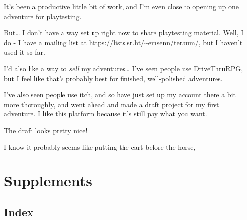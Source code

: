 \documentclass[11pt]{article}
\begin{document}
It's been a productive little bit of work, and I'm even close to
opening up one adventure for playtesting.

But\ldots{} I don't have a way set up right now to share playtesting
material. Well, I do - I have a mailing list at
\url{https://lists.sr.ht/\~emsenn/teraum/}, but I haven't used it so far.

I'd also like a way to \emph{sell} my adventures\ldots{} I've seen people use
DriveThruRPG, but I feel like that's probably best for finished,
well-polished adventures.

I've also seen people use itch, and so have just set up my account
there a bit more thoroughly, and went ahead and made a draft project
for my first adventure. I like this platform because it's still pay
what you want.

The draft looks pretty nice!

I know it probably seems like putting the cart before the horse,
\stopcontents[level-2]


\section*{Supplements}
\label{sec:org07d6028}
\subsection*{Index}
\label{sec:orge738afc}
\end{document}
